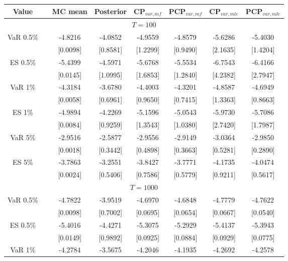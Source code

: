 { \renewcommand{\arraystretch}{1.2} 
{\footnotesize 
\begin{table} 
\center 
\begin{tabular}{cc cccccc} 
Value && MC mean & Posterior & CP$_{var,mf}$ & PCP$_{var,mf}$ & CP$_{var,mle}$ & PCP$_{var,mle }$\\ \hline 
\hline 
\multicolumn{8}{c}{$T =100$}  \\ 
\hline 
\rowcolor{LightCyan} 
VaR 0.5\% && -4.8216 & -4.0852 & -4.9559 & -4.8579 & -5.6286 & -5.4030 \\ 
  && [0.0098] & [0.8581] & [1.2299] & [0.9490] & [2.1635] & [1.4204] \\ 
\rowcolor{LightCyan} 
ES 0.5\% && -5.4399 & -4.5971 & -5.6768 & -5.5534 & -6.7543 & -6.4166 \\ 
  && [0.0145] & [1.0995] & [1.6853] & [1.2840] & [4.2382] & [2.7947] \\ [1ex]
\rowcolor{LightCyan} 
VaR 1\% && -4.3184 & -3.6780 & -4.4003 & -4.3201 & -4.8587 & -4.6949 \\ 
  && [0.0058] & [0.6961] & [0.9650] & [0.7415] & [1.3363] & [0.8663] \\ 
\rowcolor{LightCyan} 
ES 1\% && -4.9894 & -4.2269 & -5.1596 & -5.0543 & -5.9730 & -5.7086 \\ 
  && [0.0084] & [0.9259] & [1.3543] & [1.0380] & [2.7420] & [1.7987] \\ [1ex]
\rowcolor{LightCyan} 
VaR 5\% && -2.9516 & -2.5877 & -2.9556 & -2.9149 & -3.0364 & -2.9850 \\ 
 && [0.0018] & [0.3442] & [0.4898] & [0.3663] & [0.5281] & [0.2890] \\ 
\rowcolor{LightCyan} 
ES 5\% && -3.7863 & -3.2551 & -3.8427 & -3.7771 & -4.1735 & -4.0474 \\ 
 && [0.0024] & [0.5406] & [0.7586] & [0.5779] & [0.9211] & [0.5617] \\ 
\hline 
\multicolumn{8}{c}{$T =1000$}  \\ 
\hline 
\rowcolor{LightCyan} 
VaR 0.5\% && -4.7822 & -3.9519 & -4.6970 & -4.6848 & -4.7779 & -4.7622 \\ 
  && [0.0098] & [0.7002] & [0.0695] & [0.0654] & [0.0667] & [0.0540] \\ 
\rowcolor{LightCyan} 
ES 0.5\% && -5.4016 & -4.4271 & -5.3075 & -5.2929 & -5.4137 & -5.3943 \\ 
  && [0.0149] & [0.9892] & [0.0925] & [0.0884] & [0.0929] & [0.0775] \\ [1ex]
\rowcolor{LightCyan} 
VaR 1\% && -4.2784 & -3.5675 & -4.2046 & -4.1935 & -4.2692 & -4.2578 \\ 

\end{tabular}
\end{table}}}
